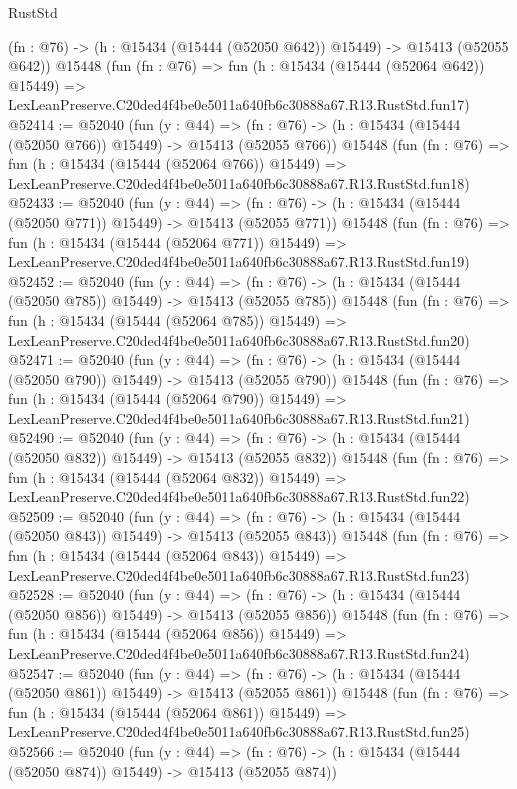 \begin{lexlean}{RustStd}
\begin{coremodule}
    (fn : @76) -> (h : @15434 (@15444 (@52050 @642)) @15449) -> @15413 (@52055 @642))
    @15448
    (fun (fn : @76) =>
    fun (h : @15434 (@15444 (@52064 @642)) @15449) =>
    LexLeanPreserve.C20ded4f4be0e5011a640fb6c30888a67.R13.RustStd.fun17)
@52414 := @52040
    (fun (y : @44) =>
    (fn : @76) -> (h : @15434 (@15444 (@52050 @766)) @15449) -> @15413 (@52055 @766))
    @15448
    (fun (fn : @76) =>
    fun (h : @15434 (@15444 (@52064 @766)) @15449) =>
    LexLeanPreserve.C20ded4f4be0e5011a640fb6c30888a67.R13.RustStd.fun18)
@52433 := @52040
    (fun (y : @44) =>
    (fn : @76) -> (h : @15434 (@15444 (@52050 @771)) @15449) -> @15413 (@52055 @771))
    @15448
    (fun (fn : @76) =>
    fun (h : @15434 (@15444 (@52064 @771)) @15449) =>
    LexLeanPreserve.C20ded4f4be0e5011a640fb6c30888a67.R13.RustStd.fun19)
@52452 := @52040
    (fun (y : @44) =>
    (fn : @76) -> (h : @15434 (@15444 (@52050 @785)) @15449) -> @15413 (@52055 @785))
    @15448
    (fun (fn : @76) =>
    fun (h : @15434 (@15444 (@52064 @785)) @15449) =>
    LexLeanPreserve.C20ded4f4be0e5011a640fb6c30888a67.R13.RustStd.fun20)
@52471 := @52040
    (fun (y : @44) =>
    (fn : @76) -> (h : @15434 (@15444 (@52050 @790)) @15449) -> @15413 (@52055 @790))
    @15448
    (fun (fn : @76) =>
    fun (h : @15434 (@15444 (@52064 @790)) @15449) =>
    LexLeanPreserve.C20ded4f4be0e5011a640fb6c30888a67.R13.RustStd.fun21)
@52490 := @52040
    (fun (y : @44) =>
    (fn : @76) -> (h : @15434 (@15444 (@52050 @832)) @15449) -> @15413 (@52055 @832))
    @15448
    (fun (fn : @76) =>
    fun (h : @15434 (@15444 (@52064 @832)) @15449) =>
    LexLeanPreserve.C20ded4f4be0e5011a640fb6c30888a67.R13.RustStd.fun22)
@52509 := @52040
    (fun (y : @44) =>
    (fn : @76) -> (h : @15434 (@15444 (@52050 @843)) @15449) -> @15413 (@52055 @843))
    @15448
    (fun (fn : @76) =>
    fun (h : @15434 (@15444 (@52064 @843)) @15449) =>
    LexLeanPreserve.C20ded4f4be0e5011a640fb6c30888a67.R13.RustStd.fun23)
@52528 := @52040
    (fun (y : @44) =>
    (fn : @76) -> (h : @15434 (@15444 (@52050 @856)) @15449) -> @15413 (@52055 @856))
    @15448
    (fun (fn : @76) =>
    fun (h : @15434 (@15444 (@52064 @856)) @15449) =>
    LexLeanPreserve.C20ded4f4be0e5011a640fb6c30888a67.R13.RustStd.fun24)
@52547 := @52040
    (fun (y : @44) =>
    (fn : @76) -> (h : @15434 (@15444 (@52050 @861)) @15449) -> @15413 (@52055 @861))
    @15448
    (fun (fn : @76) =>
    fun (h : @15434 (@15444 (@52064 @861)) @15449) =>
    LexLeanPreserve.C20ded4f4be0e5011a640fb6c30888a67.R13.RustStd.fun25)
@52566 := @52040
    (fun (y : @44) =>
    (fn : @76) -> (h : @15434 (@15444 (@52050 @874)) @15449) -> @15413 (@52055 @874))

\end{coremodule}
\end{lexlean}
